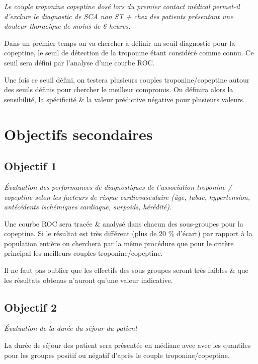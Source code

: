 \documentclass[
  a4paperpaper,
  french,
  oneside,
  open=any]{scrreprt}
\begin{document}
\emph{Le couple troponine copeptine dosé lors du premier contact médical
permet-il d'exclure le diagnostic de SCA non ST + chez des patients
présentant une douleur thoracique de moins de 6 heures.}

Dans un premier temps on va chercher à définir un seuil diagnostic pour
la copeptine, le seuil de détection de la troponine étant considéré
comme connu. Ce seuil sera défini par l'analyse d'une courbe ROC.

Une fois ce seuil défini, on testera plusieurs couples
troponine/copeptine autour des seuils définis pour chercher le meilleur
compromis. On définira alors la sensibilité, la spécificité \& la valeur
prédictive négative pour plusieurs valeurs.

\hypertarget{objectifs-secondaires}{%
\chapter{Objectifs secondaires}\label{objectifs-secondaires}}

\hypertarget{objectif-1}{%
\section{Objectif 1}\label{objectif-1}}

\emph{Évaluation des performances de diagnostiques de l'association
troponine / copeptine selon les facteurs de risque cardiovasculaire
(âge, tabac, hypertension, antécédents ischémiques cardiaque, surpoids,
hérédité).}

Une courbe ROC sera tracée \& analysé dans chacun des sous-groupes pour
la copeptine. Si le résultat est très différent (plus de 20 \% d'écart)
par rapport à la population entière on cherchera par la même procédure
que pour le critère principal les meilleurs couples troponine/copeptine.

Il ne faut pas oublier que les effectifs des sous groupes seront très
faibles \& que les résultats obtenus n'auront qu'une valeur indicative.

\hypertarget{objectif-2}{%
\section{Objectif 2}\label{objectif-2}}

\emph{Évaluation de la durée du séjour du patient}

La durée de séjour des patient sera présentée en médiane avec avec les
quantiles pour les groupes positif ou négatif d'après le couple
troponine/copeptine.
\end{document}
